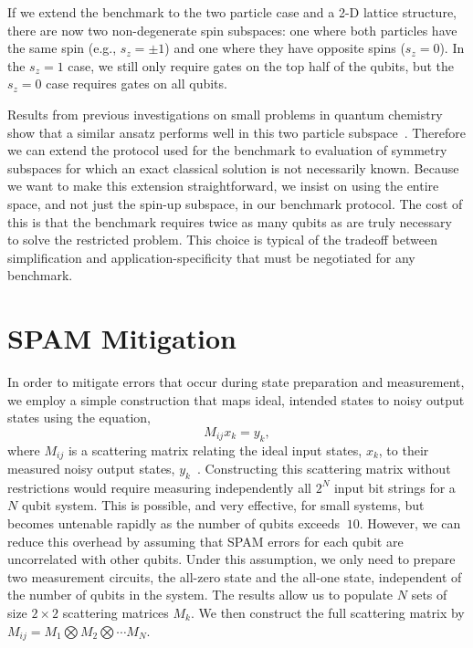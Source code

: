 \documentclass[
prx,
superscriptaddress,
twocolumn,
longbibliography
]{revtex4-1}
\begin{document}
If we extend the benchmark to the two particle case and a 2-D lattice structure, there are now two non-degenerate spin subspaces: one where both particles have the same spin (e.g., $s_z=\pm1$) and one where they have opposite spins ($s_z=0$). In the $s_z=1$ case, we still only require gates on the top half of the qubits, but the $s_z=0$ case requires gates on all qubits.

Results from previous investigations on small problems in quantum chemistry show that a similar ansatz performs well in this two particle subspace~\cite{gard2019efficient,doi.org/10.1002/qute.202100012}. Therefore we can extend the protocol used for the benchmark to evaluation of symmetry subspaces for which an exact classical solution is not necessarily known. Because we want to make this extension straightforward, we insist on using the entire space, and not just the spin-up subspace, in our benchmark protocol. The cost of this is that the benchmark requires twice as many qubits as are truly necessary to solve the restricted problem. This choice is typical of the tradeoff between simplification and application-specificity that must be negotiated for any benchmark.

\section{SPAM Mitigation}
\label{app:symmerr}
In order to mitigate errors that occur during state preparation and measurement, we employ a simple construction that maps ideal, intended states to noisy output states using the equation,
\begin{equation}
    M_{ij}x_k=y_k ,
\end{equation}
where $M_{ij}$ is a scattering matrix relating the ideal input states, $x_k$, to their measured noisy output states, $y_k$~\cite{qiskit_spam}. Constructing this scattering matrix without restrictions would require measuring independently all $2^N$ input bit strings for a $N$ qubit system. This is possible, and very effective, for small systems, but becomes untenable rapidly as the number of qubits exceeds $~10$. However, we can reduce this overhead by assuming that SPAM errors for each qubit are uncorrelated with other qubits. Under this assumption, we only need to prepare two measurement circuits, the all-zero state and the all-one state, independent of the number of qubits in the system. The results allow us to populate $N$ sets of size $2 \times 2$ scattering matrices $M_k$. We then construct the full scattering matrix by $M_{ij}=M_1\bigotimes M_2\bigotimes \cdots M_N$. 
\end{document}
